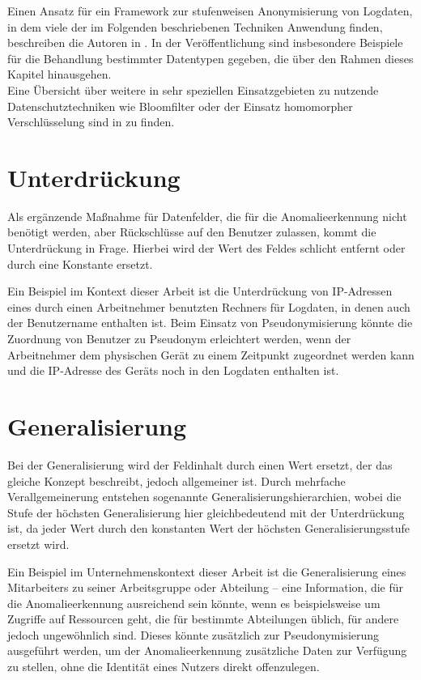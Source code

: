 Einen Ansatz für ein Framework zur stufenweisen Anonymisierung von Logdaten, in dem viele der im Folgenden beschriebenen Techniken Anwendung finden, beschreiben die Autoren in \cite{slagell2006flaim}. In der Veröffentlichung sind insbesondere Beispiele für die Behandlung bestimmter Datentypen gegeben, die über den Rahmen dieses Kapitel hinausgehen.\\
Eine Übersicht über weitere in sehr speziellen Einsatzgebieten zu nutzende Datenschutztechniken wie Bloomfilter oder der Einsatz homomorpher Verschlüsselung sind in \cite{niksefat2017privacy} zu finden.

\section{Unterdrückung} %

Als ergänzende Maßnahme für Datenfelder, die für die Anomalieerkennung nicht benötigt werden, aber Rückschlüsse auf den Benutzer zulassen, kommt die Unterdrückung in Frage. Hierbei wird der Wert des Feldes schlicht entfernt oder durch eine Konstante ersetzt. 

Ein Beispiel im Kontext dieser Arbeit ist die Unterdrückung von IP-Adressen eines durch einen Arbeitnehmer benutzten Rechners für Logdaten, in denen auch der Benutzername enthalten ist. Beim Einsatz von Pseudonymisierung könnte die Zuordnung von Benutzer zu Pseudonym erleichtert werden, wenn der Arbeitnehmer dem physischen Gerät zu einem Zeitpunkt zugeordnet werden kann und die IP-Adresse des Geräts noch in den Logdaten enthalten ist.

\section{Generalisierung}

Bei der Generalisierung wird der Feldinhalt durch einen Wert ersetzt, der das gleiche Konzept beschreibt, jedoch allgemeiner ist. Durch mehrfache Verallgemeinerung entstehen sogenannte Generalisierungshierarchien, wobei die Stufe der höchsten Generalisierung hier gleichbedeutend mit der Unterdrückung ist, da jeder Wert durch den konstanten Wert der höchsten Generalisierungsstufe ersetzt wird.

Ein Beispiel im Unternehmenskontext dieser Arbeit ist die Generalisierung eines Mitarbeiters zu seiner Arbeitsgruppe oder Abteilung -- eine Information, die für die Anomalieerkennung ausreichend sein könnte, wenn es beispielsweise um Zugriffe auf Ressourcen geht, die für bestimmte Abteilungen üblich, für andere jedoch ungewöhnlich sind. Dieses könnte zusätzlich zur Pseudonymisierung ausgeführt werden, um der Anomalieerkennung zusätzliche Daten zur Verfügung zu stellen, ohne die Identität eines Nutzers direkt offenzulegen.

